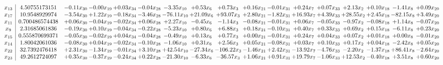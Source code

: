 \documentclass[9pt]{article}
\begin{document}
 \[\begin{array}{c| c c@{\hskip 2pt} c@{\hskip 2pt} c@{\hskip 2pt} c@{\hskip 2pt} c@{\hskip 2pt} c@{\hskip 2pt} c@{\hskip 2pt} c@{\hskip 2pt} c@{\hskip 2pt} c@{\hskip 2pt} c@{\hskip 2pt} c@{\hskip 2pt} c@{\hskip 2pt} c@{\hskip 2pt} c@{\hskip 2pt} }
 x_{13}   &  4.50755173151 & -0.11 x_{30} & -0.00 x_{19} & +  0.03 x_{34} & -0.04 x_{28} & -3.35 x_{10} & +  0.53 x_{6} & +  0.73 x_{3} & +  0.16 x_{21} & -0.01 x_{31} & +  0.24 x_{7} & +  0.07 x_{33} & +  2.13 x_{2} & +  0.10 x_{18} & -1.41 x_{8} & +  0.09 x_{20}\\
 x_{17}   &  10.9548929974 & -3.54 x_{30} & +  1.22 x_{19} & -0.18 x_{34} & -3.46 x_{28} & -76.11 x_{10} & + 21.09 x_{6} & + 93.07 x_{3} & +  2.80 x_{21} & -1.82 x_{31} & + 16.93 x_{7} & +  4.39 x_{33} & + 28.55 x_{2} & +  2.45 x_{18} & -82.15 x_{8} & +  3.49 x_{20}\\
 x_{11}   &  0.700486574438 & +  0.06 x_{30} & -0.04 x_{19} & -0.02 x_{34} & +  0.06 x_{28} & +  2.27 x_{10} & -0.45 x_{6} & -1.14 x_{3} & -0.08 x_{21} & -0.01 x_{31} & +  0.06 x_{7} & -0.05 x_{33} & -0.97 x_{2} & -0.08 x_{18} & +  1.14 x_{8} & -0.07 x_{20}\\
 x_{9}   &  2.31685061836 & -0.19 x_{30} & +  0.10 x_{19} & -0.04 x_{34} & -0.22 x_{28} & -5.23 x_{10} & +  0.80 x_{6} & +  6.88 x_{3} & +  0.18 x_{21} & -0.10 x_{31} & +  0.40 x_{7} & +  0.33 x_{33} & +  0.69 x_{2} & +  0.15 x_{18} & -6.11 x_{8} & +  0.23 x_{20}\\
 x_{15}   &  0.555870699371 & -0.05 x_{30} & -0.02 x_{19} & +  0.04 x_{34} & -0.04 x_{28} & -0.49 x_{10} & +  0.13 x_{6} & +  0.77 x_{3} & +  0.00 x_{21} & -0.01 x_{31} & +  0.24 x_{7} & +  0.04 x_{33} & +  0.07 x_{2} & +  0.01 x_{18} & +  0.00 x_{8} & -0.01 x_{20}\\
 x_{14}   &  1.80042061036 & -0.08 x_{30} & +  0.04 x_{19} & -0.02 x_{34} & -0.10 x_{28} & -1.06 x_{10} & +  0.31 x_{6} & +  2.56 x_{3} & +  0.05 x_{21} & -0.08 x_{31} & +  0.03 x_{7} & +  0.10 x_{33} & +  0.17 x_{2} & +  0.04 x_{18} & -2.42 x_{8} & +  0.05 x_{20}\\
 x_{22}   &  32.7392476418 & +  2.31 x_{30} & -1.34 x_{19} & -0.01 x_{34} & +  3.10 x_{28} & + 42.54 x_{10} & -27.34 x_{6} & -106.22 x_{3} & -1.46 x_{21} & +  2.42 x_{31} & -13.92 x_{7} & -4.76 x_{33} & -2.20 x_{2} & -1.37 x_{18} & + 86.41 x_{8} & -2.64 x_{20}\\
 x_{23}   &  49.2612724097 & +  0.35 x_{30} & -0.37 x_{19} & -0.24 x_{34} & +  0.22 x_{28} & -21.30 x_{10} & -6.33 x_{6} & -36.57 x_{3} & +  1.06 x_{21} & +  0.91 x_{31} & + 19.79 x_{7} & -1.06 x_{33} & + 12.53 x_{2} & -0.40 x_{18} & +  3.51 x_{8} & +  0.60 x_{20}\\

\end{array}\]
\end{document}
